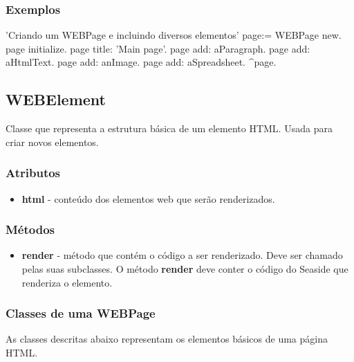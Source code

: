 \subsubsection{Exemplos}

\begin{godCode}
'Criando um WEBPage e incluindo diversos elementos'
page:= WEBPage new.
page initialize.
page title: 'Main page'.
page add: aParagraph.
page add: aHtmlText.
page add: anImage.
page add: aSpreadsheet.
^page.
\end{godCode}


\subsection{WEBElement} 

Classe que representa a estrutura básica de um elemento HTML. Usada para criar novos elementos.

\subsubsection{Atributos}

\begin{itemize}
 \item \textbf{html} - conteúdo dos elementos web que serão renderizados.
\end{itemize}


\subsubsection{Métodos}

\begin{itemize}
 \item \textbf{render} - método que contém o código a ser renderizado. Deve ser chamado pelas suas subclasses. O método \textbf{render} deve conter o código 
 do Seaside que renderiza o elemento.
\end{itemize}

\subsubsection{Classes de uma WEBPage}

As classes descritas abaixo representam os elementos básicos de uma página HTML.

